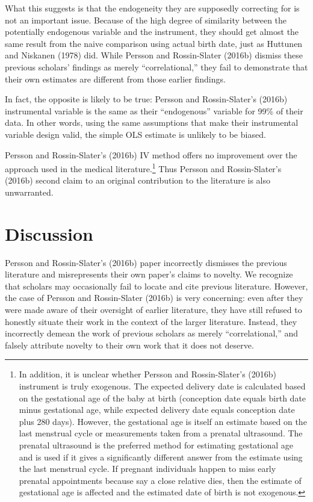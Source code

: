 \documentclass[a4paper,12pt]{article}
\begin{document}
What this suggests is that the endogeneity they are supposedly correcting for is not an important issue. Because of the high degree of similarity between the potentially endogenous variable and the instrument, they should get almost the same result from the naive comparison using actual birth date, just as Huttunen and Niskanen (1978) did.  While Persson and Rossin-Slater (2016b) dismiss these previous scholars' findings as merely ``correlational,'' they  fail to demonstrate that their own estimates are different from those earlier findings.

In fact, the opposite is likely to be true:  Persson and Rossin-Slater's (2016b) instrumental variable is the same as their ``endogenous'' variable for 99\% of their data. In other words, using the same assumptions that make their instrumental variable design valid, the simple OLS estimate is unlikely to be biased.

Persson and Rossin-Slater's (2016b) IV method offers no improvement over the approach used in the medical literature.\footnote{In addition, it is unclear whether Persson and Rossin-Slater's (2016b) instrument is truly exogenous. The expected delivery date is calculated based on the gestational age of the baby at birth (conception date equals birth date minus gestational age, while expected delivery date equals conception date plus 280 days). However, the gestational age is itself an estimate based on the last menstrual cycle or measurements taken from a prenatal ultrasound. The prenatal ultrasound is the preferred method for estimating gestational age and is used if it gives a significantly different answer from the estimate using the last menstrual cycle. If pregnant individuals happen to miss early    prenatal appointments because say a close relative dies, then the estimate of gestational age is affected and the estimated date of birth is not exogenous.} Thus Persson and Rossin-Slater's (2016b) second claim to an original contribution to the literature is also unwarranted. 

\section{Discussion}
Persson and Rossin-Slater's (2016b) paper incorrectly dismisses the previous literature and misrepresents their own paper's claims to novelty. We recognize that scholars  may occasionally fail to locate and cite previous literature. However, the case of Persson and Rossin-Slater (2016b) is very concerning: even after they were made aware of their oversight of earlier literature, they have still  refused to honestly situate their work in the context of the larger literature. Instead, they incorrectly demean the work of previous scholars as merely ``correlational,'' and falsely attribute novelty to their own work that it does not deserve.
\end{document}
